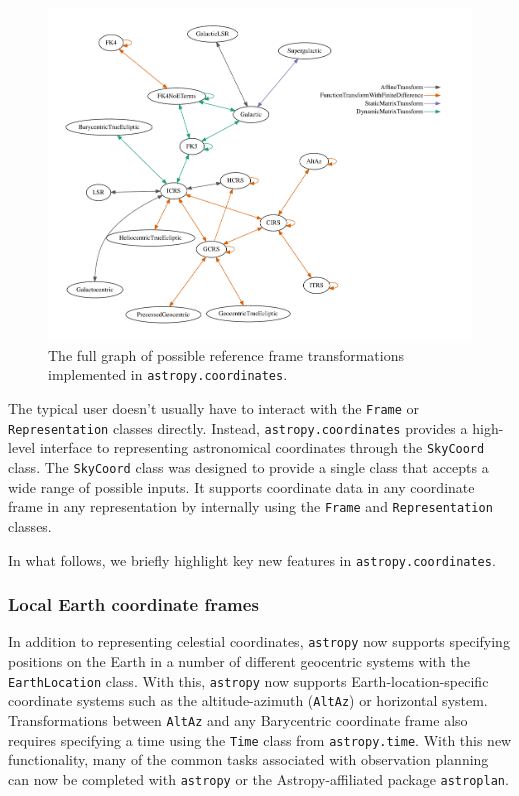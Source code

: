 \documentclass[modern]{aastex61}
\newcommand{\package}[1]{\texttt{#1}\xspace}
\newcommand{\astropy}{Astropy\xspace}
\newcommand{\astropypkg}{\package{astropy}}
\begin{document}
\begin{figure}
\includegraphics[width=\textwidth]{coordinates_graph.pdf}
\caption{%
    The full graph of possible reference frame transformations implemented in
    \texttt{astropy.coordinates}.
    \label{fig:frame-transform-graph}
}
\end{figure}

The typical user doesn't usually have to interact with the \texttt{Frame} or
\texttt{Representation} classes directly.
Instead, \texttt{astropy.coordinates} provides a high-level interface to
representing astronomical coordinates through the \texttt{SkyCoord} class.
The \texttt{SkyCoord} class was designed to provide a single class that
accepts a wide range of possible inputs.
It supports coordinate data in any coordinate frame in any representation by
internally using the \texttt{Frame} and \texttt{Representation} classes.

In what follows, we briefly highlight key new features in
\texttt{astropy.coordinates}.

\subsubsection{Local Earth coordinate frames}
In addition to representing celestial
    coordinates, \astropypkg now supports specifying positions on the Earth in
    a number of different geocentric systems with the \texttt{EarthLocation}
    class.
    With this, \astropypkg now supports Earth-location-specific coordinate
    systems such as the altitude-azimuth (\texttt{AltAz}) or horizontal system.
    Transformations between \texttt{AltAz} and any Barycentric coordinate frame
    also requires specifying a time using the \texttt{Time} class from
    \texttt{astropy.time}.
    With this new functionality, many of the common tasks associated with
    observation planning can now be completed with \astropypkg or the
    \astropy-affiliated package \package{astroplan}\citep{astroplan_AAS}.
\end{document}
